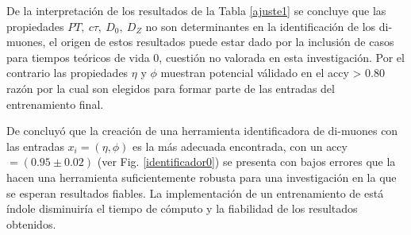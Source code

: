 De la interpretación de los resultados de la Tabla \ref{ajuste1} se concluye que las propiedades $PT, ~ c\tau, ~ D_0, ~D_Z$ no son determinantes en la identificación de los di-muones, el origen de estos resultados puede estar dado por la inclusión de casos para tiempos teóricos de vida 0, cuestión no valorada en esta investigación. Por el contrario las propiedades $\eta$ y $\phi$ muestran potencial válidado en el \textsf{accy} > 0.80 razón por la cual son elegidos para formar parte de las entradas del entrenamiento final. 

De concluyó que la creación de una herramienta identificadora de di-muones con las entradas $x_i=(\eta,\phi)$ es la más adecuada encontrada, con un \textsf{accy} $= (0.95 \pm 0.02)$ (ver Fig. \ref{identificador0}) se presenta con bajos errores que la hacen una herramienta suficientemente robusta para una investigación en la que se esperan resultados fiables. La implementación de un entrenamiento de está índole disminuiría el tiempo de cómputo y la fiabilidad de los resultados obtenidos.















